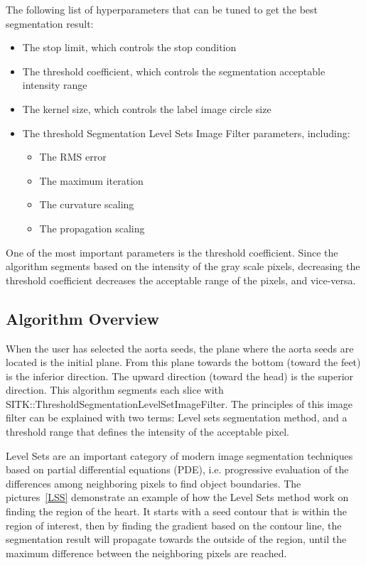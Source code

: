 The following list of hyperparameters that can be tuned to get the best segmentation result:
\begin{itemize}
\item The stop limit, which controls the stop condition
\item The threshold coefficient, which controls the segmentation acceptable intensity range
\item The kernel size, which controls the label image circle size 
\item The threshold Segmentation Level Sets Image Filter parameters, including:
\begin{itemize}
\item The RMS error
\item The maximum iteration
\item The curvature scaling
\item The propagation scaling
\end{itemize}
\end{itemize}

One of the most important parameters is the threshold coefficient. Since the algorithm segments based on the intensity of the gray scale pixels, decreasing the threshold coefficient decreases the acceptable range of the pixels, and vice-versa. 


\subsection{Algorithm Overview} \label{algo}

When the user has selected the aorta seeds, the plane where the aorta seeds are located is the initial plane. From this plane towards the bottom (toward the feet) is the inferior direction. The upward direction (toward the head) is the superior direction. This algorithm segments each slice with SITK::ThresholdSegmentationLevelSetImageFilter. The principles of this image filter can be explained with two terms: Level sets segmentation method, and a threshold range that defines the intensity of the acceptable pixel.

Level Sets are an important category of modern image segmentation techniques based on partial differential equations (PDE), i.e. progressive evaluation of the differences among neighboring pixels to find object boundaries. The pictures~\ref{LSS} demonstrate an example of how the Level Sets method work on finding the region of the heart. It starts with a seed contour that is within the region of interest, then by finding the gradient based on the contour line, the segmentation result will propagate towards the outside of the region, until the maximum difference between the neighboring pixels are reached.

